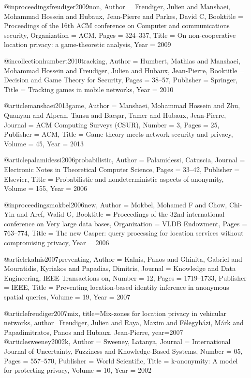 {{{{{{{{{@inproceedings{freudiger2009non,
	Author = {Freudiger, Julien and Manshaei, Mohammad Hossein and Hubaux, Jean-Pierre and Parkes, David C},
	Booktitle = {Proceedings of the 16th ACM conference on Computer and communications security},
	Organization = {ACM},
	Pages = {324--337},
	Title = {On non-cooperative location privacy: a game-theoretic analysis},
	Year = {2009}}

@incollection{humbert2010tracking,
	Author = {Humbert, Mathias and Manshaei, Mohammad Hossein and Freudiger, Julien and Hubaux, Jean-Pierre},
	Booktitle = {Decision and Game Theory for Security},
	Pages = {38--57},
	Publisher = {Springer},
	Title = {Tracking games in mobile networks},
	Year = {2010}}

@article{manshaei2013game,
	Author = {Manshaei, Mohammad Hossein and Zhu, Quanyan and Alpcan, Tansu and Bac{\c{s}}ar, Tamer and Hubaux, Jean-Pierre},
	Journal = {ACM Computing Surveys (CSUR)},
	Number = {3},
	Pages = {25},
	Publisher = {ACM},
	Title = {Game theory meets network security and privacy},
	Volume = {45},
	Year = {2013}}

@article{palamidessi2006probabilistic,
	Author = {Palamidessi, Catuscia},
	Journal = {Electronic Notes in Theoretical Computer Science},
	Pages = {33--42},
	Publisher = {Elsevier},
	Title = {Probabilistic and nondeterministic aspects of anonymity},
	Volume = {155},
	Year = {2006}}

@inproceedings{mokbel2006new,
	Author = {Mokbel, Mohamed F and Chow, Chi-Yin and Aref, Walid G},
	Booktitle = {Proceedings of the 32nd international conference on Very large data bases},
	Organization = {VLDB Endowment},
	Pages = {763--774},
	Title = {The new Casper: query processing for location services without compromising privacy},
	Year = {2006}}

@article{kalnis2007preventing,
	Author = {Kalnis, Panos and Ghinita, Gabriel and Mouratidis, Kyriakos and Papadias, Dimitris},
	Journal = {Knowledge and Data Engineering, IEEE Transactions on},
	Number = {12},
	Pages = {1719--1733},
	Publisher = {IEEE},
	Title = {Preventing location-based identity inference in anonymous spatial queries},
	Volume = {19},
	Year = {2007}}
	
@article{freudiger2007mix,
  title={Mix-zones for location privacy in vehicular networks},
  author={Freudiger, Julien and Raya, Maxim and F{\'e}legyh{\'a}zi, M{\'a}rk and Papadimitratos, Panos and Hubaux, Jean-Pierre},
  year={2007}
}
@article{sweeney2002k,
	Author = {Sweeney, Latanya},
	Journal = {International Journal of Uncertainty, Fuzziness and Knowledge-Based Systems},
	Number = {05},
	Pages = {557--570},
	Publisher = {World Scientific},
	Title = {k-anonymity: A model for protecting privacy},
	Volume = {10},
	Year = {2002}}

}}}}}}}}}
